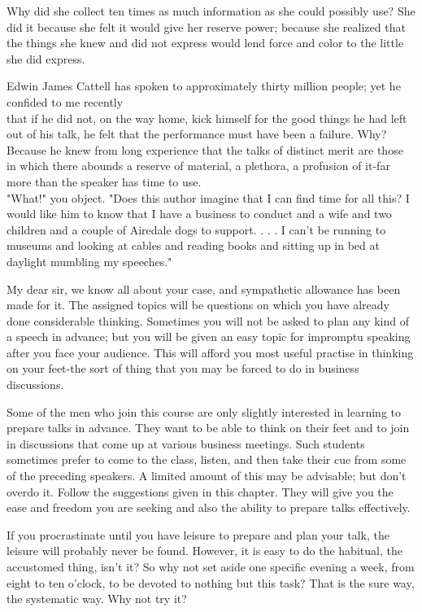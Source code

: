 \documentclass[10pt]{article}
\begin{document}
Why did she collect ten times as much information as she could possibly use? She did it because she felt it would give her reserve power; because she realized that the things she knew and did not express would lend force and color to the little she did express.

Edwin James Cattell has spoken to approximately thirty million people; yet he confided to me recently\\
that if he did not, on the way home, kick himself for the good things he had left out of his talk, he felt that the performance must have been a failure. Why? Because he knew from long experience that the talks of distinct merit are those in which there abounds a reserve of material, a plethora, a profusion of it-far more than the speaker has time to use.\\
"What!" you object. "Does this author imagine that I can find time for all this? I would like him to know that I have a business to conduct and a wife and two children and a couple of Airedale dogs to support. . . . I can't be running to museums and looking at cables and reading books and sitting up in bed at daylight mumbling my speeches."

My dear sir, we know all about your case, and sympathetic allowance has been made for it. The assigned topics will be questions on which you have already done considerable thinking. Sometimes you will not be asked to plan any kind of a speech in advance; but you will be given an easy topic for impromptu speaking after you face your audience. This will afford you most useful practise in thinking on your feet-the sort of thing that you may be forced to do in business discussions.

Some of the men who join this course are only slightly interested in learning to prepare talks in advance. They want to be able to think on their feet and to join in discussions that come up at various business meetings. Such students sometimes prefer to come to the class, listen, and then take their cue from some of the preceding speakers. A limited amount of this may be advisable; but don't\\
overdo it. Follow the suggestions given in this chapter. They will give you the ease and freedom you are seeking and also the ability to prepare talks effectively.

If you procrastinate until you have leisure to prepare and plan your talk, the leisure will probably never be found. However, it is easy to do the habitual, the accustomed thing, isn't it? So why not set aside one specific evening a week, from eight to ten o'clock, to be devoted to nothing but this task? That is the sure way, the systematic way. Why not try it?
\end{document}
